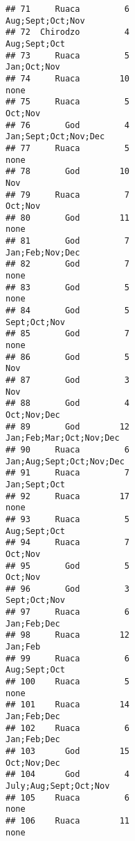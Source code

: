 \documentclass[
]{article}
\begin{document}
\begin{verbatim}
## 71     Ruaca         6                               Aug;Sept;Oct;Nov
## 72  Chirodzo         4                                   Aug;Sept;Oct
## 73     Ruaca         5                                    Jan;Oct;Nov
## 74     Ruaca        10                                           none
## 75     Ruaca         5                                        Oct;Nov
## 76       God         4                           Jan;Sept;Oct;Nov;Dec
## 77     Ruaca         5                                           none
## 78       God        10                                            Nov
## 79     Ruaca         7                                        Oct;Nov
## 80       God        11                                           none
## 81       God         7                                Jan;Feb;Nov;Dec
## 82       God         7                                           none
## 83       God         5                                           none
## 84       God         5                                   Sept;Oct;Nov
## 85       God         7                                           none
## 86       God         5                                            Nov
## 87       God         3                                            Nov
## 88       God         4                                    Oct;Nov;Dec
## 89       God        12                        Jan;Feb;Mar;Oct;Nov;Dec
## 90     Ruaca         6                       Jan;Aug;Sept;Oct;Nov;Dec
## 91     Ruaca         7                                   Jan;Sept;Oct
## 92     Ruaca        17                                           none
## 93     Ruaca         5                                   Aug;Sept;Oct
## 94     Ruaca         7                                        Oct;Nov
## 95       God         5                                        Oct;Nov
## 96       God         3                                   Sept;Oct;Nov
## 97     Ruaca         6                                    Jan;Feb;Dec
## 98     Ruaca        12                                        Jan;Feb
## 99     Ruaca         6                                   Aug;Sept;Oct
## 100    Ruaca         5                                           none
## 101    Ruaca        14                                    Jan;Feb;Dec
## 102    Ruaca         6                                    Jan;Feb;Dec
## 103      God        15                                    Oct;Nov;Dec
## 104      God         4                          July;Aug;Sept;Oct;Nov
## 105    Ruaca         6                                           none
## 106    Ruaca        11                                           none

\end{verbatim}
\end{document}
